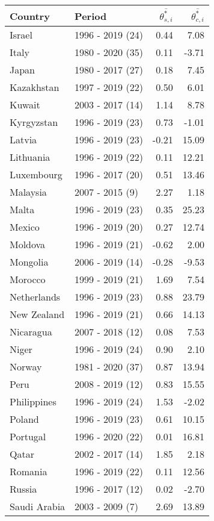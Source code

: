 \begin{table}[pos=h]
{{\centering
\begin{tabular}{llrr} \toprule
Country & Period & $\overline{\theta^*_{s,i}}$ & $\overline{\theta^*_{c,i}}$\\
\midrule
Israel & 1996 - 2019 (24) & 0.44 & 7.08\\
Italy & 1980 - 2020 (35) & 0.11 & -3.71\\
Japan & 1980 - 2017 (27) & 0.18 & 7.45\\
Kazakhstan & 1997 - 2019 (22) & 0.50 & 6.01\\
Kuwait & 2003 - 2017 (14) & 1.14 & 8.78\\
\addlinespace
Kyrgyzstan & 1996 - 2019 (23) & 0.73 & -1.01\\
Latvia & 1996 - 2019 (23) & -0.21 & 15.09\\
Lithuania & 1996 - 2019 (22) & 0.11 & 12.21\\
Luxembourg & 1996 - 2017 (20) & 0.51 & 13.46\\
Malaysia & 2007 - 2015 (9) & 2.27 & 1.18\\
\addlinespace
Malta & 1996 - 2019 (23) & 0.35 & 25.23\\
Mexico & 1996 - 2019 (20) & 0.27 & 12.74\\
Moldova & 1996 - 2019 (21) & -0.62 & 2.00\\
Mongolia & 2006 - 2019 (14) & -0.28 & -9.53\\
Morocco & 1999 - 2019 (21) & 1.69 & 7.54\\
\addlinespace
Netherlands & 1996 - 2019 (23) & 0.88 & 23.79\\
New Zealand & 1996 - 2019 (21) & 0.66 & 14.13\\
Nicaragua & 2007 - 2018 (12) & 0.08 & 7.53\\
Niger & 1996 - 2019 (24) & 0.90 & 2.10\\
Norway & 1981 - 2020 (37) & 0.87 & 13.94\\
\addlinespace
Peru & 2008 - 2019 (12) & 0.83 & 15.55\\
Philippines & 1996 - 2019 (24) & 1.53 & -2.02\\
Poland & 1996 - 2019 (23) & 0.61 & 10.15\\
Portugal & 1996 - 2020 (22) & 0.01 & 16.81\\
Qatar & 2002 - 2017 (14) & 1.85 & 2.18\\
\addlinespace
Romania & 1996 - 2019 (22) & 0.11 & 12.56\\
Russia & 1996 - 2017 (12) & 0.02 & -2.70\\
Saudi Arabia & 2003 - 2009 (7) & 2.69 & 13.89\\

\end{tabular}}}
\end{table}
